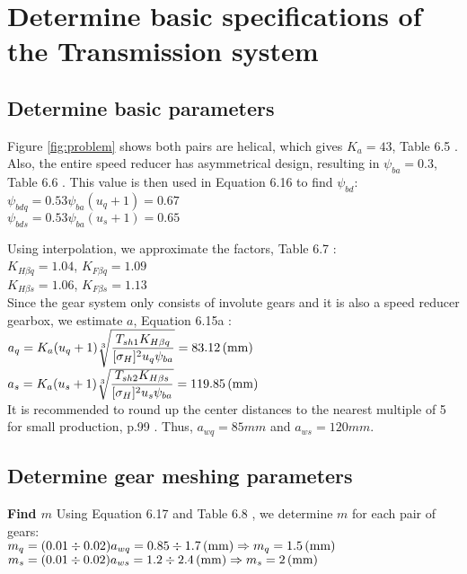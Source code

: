 \section{Determine basic specifications of the Transmission system}

\subsection{Determine basic parameters}
	Figure \ref{fig:problem} shows both pairs are helical, which  gives $ K_a = 43 $, Table 6.5 \cite{tk1}. Also, the entire speed reducer has asymmetrical design, resulting in $ \psi_{ba} = 0.3$, Table 6.6 \cite{tk1}. This value is then used in Equation 6.16 \cite{tk1} to find $ \psi_{bd} $:\\
$ \psi_{bdq} = 0.53\psi_{ba}(u_q+1) = 0.67 $\\
$ \psi_{bds} = 0.53\psi_{ba}(u_s+1) = 0.65 $

Using interpolation, we approximate the factors, Table 6.7 \cite{tk1}:\\
$ K_{H\beta q} = 1.04 $, $ K_{F\beta q} = 1.09 $\\
$ K_{H\beta s} = 1.06 $, $ K_{F\beta s} = 1.13 $\\
Since the gear system only consists of involute gears and it is also a speed reducer gearbox, we estimate $ a $, Equation 6.15a \cite{tk1}:\\
$ a_q = K_a(u_{q}+1)\sqrt[3]{\dfrac{T_{sh1}K_{H\beta q}}{[{\sigma}_H]^2u_{q}\psi_{ba}}} = 83.12 \, (\mathrm{mm})$\\
$ a_s = K_a(u_{s}+1)\sqrt[3]{\dfrac{T_{sh2}K_{H\beta s}}{[{\sigma}_H]^2u_{s}\psi_{ba}}} = 119.85 \, (\mathrm{mm})$\\

It is recommended to round up the center distances to the nearest multiple of 5 for small production, p.99 \cite{tk1}. Thus, $ a_{wq}=85\unit{mm} $ and $ a_{ws}=120\unit{mm} $.

\subsection{Determine gear meshing parameters}

\textbf{Find $ m $} Using Equation 6.17 \cite{tk1} and Table 6.8 \cite{tk1}, we determine $ m $ for each pair of gears:\\
$ m_q = (0.01\div0.02)a_{wq} = 0.85\div1.7 \, (\mathrm{mm}) \Rightarrow m_q=1.5\, \mathrm{(mm)}$\\
$ m_s = (0.01\div0.02)a_{ws} = 1.2\div2.4 \, (\mathrm{mm}) \Rightarrow m_s=2\, \mathrm{(mm)}$
	
